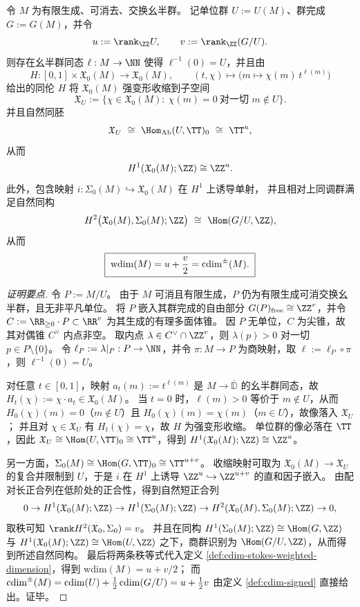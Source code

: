 \begin{theorem}\label{thm:cdim-stokes-character-contraction-general-monoid}
令 \(M\) 为有限生成、可消去、交换幺半群。
记单位群 \(U:=U(M)\)、群完成 \(G:=G(M)\)，并令
\[
u:=\rank_{\ZZ}U,\qquad v:=\rank_{\ZZ}(G/U).
\]
则存在幺半群同态 \(\ell:M\to\NN\) 使得 \(\ell^{-1}(0)=U\)，并且由
\[
H:[0,1]\times \mathfrak X_0(M)\to \mathfrak X_0(M),\qquad
(t,\chi)\longmapsto \bigl(m\mapsto \chi(m)\,t^{\ell(m)}\bigr)
\]
给出的同伦 \(H\) 将 \(\mathfrak X_0(M)\) 强变形收缩到子空间
\[
\mathfrak X_U:=\{\chi\in \mathfrak X_0(M):\ \chi(m)=0\ \text{对一切 }m\notin U\}.
\]
并且自然同胚
\[
\mathfrak X_U\ \cong\ \Hom_{\mathrm{Ab}}(U,\TT)_0\ \cong\ \TT^{u},
\]
从而
\[
H^{1}(\mathfrak X_0(M);\ZZ)\cong \ZZ^{u}.
\]
此外，包含映射 \(i:\Sigma_0(M)\hookrightarrow \mathfrak X_0(M)\) 在 \(H^{1}\) 上诱导单射，
并且相对上同调群满足自然同构
\[
H^{2}\bigl(\mathfrak X_0(M),\Sigma_0(M);\ZZ\bigr)\ \cong\ \Hom(G/U,\ZZ),
\]
从而
\[
\boxed{\;\mathrm{wdim}(M)=u+\frac{v}{2}=\operatorname{cdim}^{\pm}(M).\;}
\]
\end{theorem}
\begin{proof}[证明要点]
令 \(P:=M/U\)。
由于 \(M\) 可消且有限生成，\(P\) 仍为有限生成可消交换幺半群，且无非平凡单位。
将 \(P\) 嵌入其群完成的自由部分 \(G(P)_{\mathrm{free}}\cong \ZZ^{v}\)，并令
\(
C:=\RR_{\ge 0}\cdot P\subset \RR^{v}
\)
为其生成的有理多面体锥。
因 \(P\) 无单位，\(C\) 为尖锥，故其对偶锥 \(C^{\vee}\) 内点非空。
取内点 \(\lambda\in C^{\vee}\cap \ZZ^{v}\)，则 \(\lambda(p)>0\) 对一切 \(p\in P\setminus\{0\}\)。
令 \(\ell_P:=\lambda|_{P}:P\to\NN\)，并令 \(\pi:M\to P\) 为商映射，取 \(\ell:=\ell_P\circ\pi\)，则 \(\ell^{-1}(0)=U\)。
\par
对任意 \(t\in[0,1]\)，映射 \(a_t(m):=t^{\ell(m)}\) 是 \(M\to\overline{\mathbb D}\) 的幺半群同态，故 \(H_t(\chi):=\chi\cdot a_t\in\mathfrak X_0(M)\)。
当 \(t=0\) 时，\(\ell(m)>0\) 等价于 \(m\notin U\)，从而 \(H_0(\chi)(m)=0\)（\(m\notin U\)）且 \(H_0(\chi)(m)=\chi(m)\)（\(m\in U\)），故像落入 \(\mathfrak X_U\)；
并且对 \(\chi\in\mathfrak X_U\) 有 \(H_t(\chi)=\chi\)，故 \(H\) 为强变形收缩。
单位群的像必落在 \(\TT\)，因此 \(\mathfrak X_U\cong \Hom(U,\TT)_0\cong \TT^{u}\)，得到 \(H^{1}(\mathfrak X_0(M);\ZZ)\cong \ZZ^{u}\)。
\par
另一方面，\(\Sigma_0(M)\cong \Hom(G,\TT)_0\cong \TT^{u+v}\)。
收缩映射可取为 \(\mathfrak X_0(M)\to \mathfrak X_U\) 的复合并限制到 \(U\)，于是 \(i\) 在 \(H^{1}\) 上诱导 \(\ZZ^{u}\hookrightarrow \ZZ^{u+v}\) 的直和因子嵌入。
由配对长正合列在低阶处的正合性，得到自然短正合列
\[
0\to H^{1}(\mathfrak X_0(M);\ZZ)\to H^{1}(\Sigma_0(M);\ZZ)\to H^{2}(\mathfrak X_0(M),\Sigma_0(M);\ZZ)\to 0,
\]
取秩可知 \(\rank H^{2}(\mathfrak X_0,\Sigma_0)=v\)。
并且在同构 \(H^{1}(\Sigma_0(M);\ZZ)\cong \Hom(G,\ZZ)\) 与
\(
H^{1}(\mathfrak X_0(M);\ZZ)\cong \Hom(U,\ZZ)
\)
之下，商群识别为 \(\Hom(G/U,\ZZ)\)，从而得到所述自然同构。
最后将两条秩等式代入定义 \ref{def:cdim-stokes-weighted-dimension}，得到 \(\mathrm{wdim}(M)=u+v/2\)；
而 \(\operatorname{cdim}^{\pm}(M)=\operatorname{cdim}(U)+\frac12\operatorname{cdim}(G/U)=u+\frac12 v\) 由定义 \ref{def:cdim-signed} 直接给出。证毕。
\end{proof}

